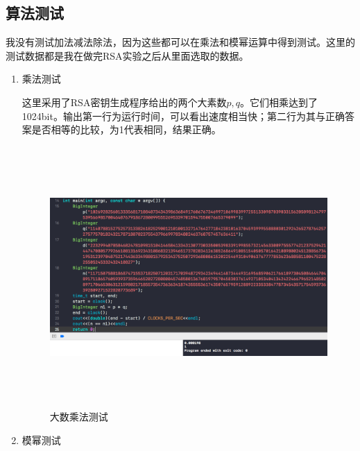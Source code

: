 \documentclass[11pt]{ctexart}
\begin{document}
\subsection{算法测试} %
我没有测试加法减法除法，因为这些都可以在乘法和模幂运算中得到测试。这里的测试数据都是我在做完RSA实验之后从里面选取的数据。
\begin{enumerate}
    \item 乘法测试

    这里采用了RSA密钥生成程序给出的两个大素数$p, q$。它们相乘达到了1024bit。输出第一行为运行时间，可以看出速度相当快；第二行为其与正确答案是否相等的比较，为1代表相同，结果正确。
    \begin{figure}[htbp]
    \centering
    \includegraphics[height=9.95cm,width=17.50cm]{test_multi.png}
    \caption{大数乘法测试}
    \label{test_multi}
    \end{figure}

    \item 模幂测试


\end{enumerate}
\end{document}
